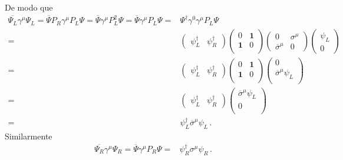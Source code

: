 De modo que
\begin{align}
  \overline{\Psi_L}\gamma^{\mu}\Psi_L=
    \overline{\Psi}P_R\gamma^{\mu}P_{L}\Psi=
  \overline{\Psi}\gamma^{\mu}P_L^2\Psi=
  \overline{\Psi}\gamma^{\mu}P_{L}\Psi=&\Psi^{\dagger}\gamma^0\gamma^{\mu}P_L \Psi \nonumber\\
=&  \begin{pmatrix}
     \psi_L^{\dagger} & \psi_R^{\dagger}  
  \end{pmatrix}
  \begin{pmatrix}
    0 & \mathbf{1} \\
    \mathbf{1} & 0 \\
  \end{pmatrix}
  \begin{pmatrix}
   0 & \sigma^{\mu}\\
   \overline{\sigma}^{\mu} & 0     
  \end{pmatrix}
  \begin{pmatrix}
   \psi_L\\
     0      
  \end{pmatrix}\nonumber\\
=&  \begin{pmatrix}
     \psi_L^{\dagger} & \psi_R^{\dagger}  
  \end{pmatrix}
  \begin{pmatrix}
    0 & \mathbf{1} \\
    \mathbf{1} & 0 \\
  \end{pmatrix}
  \begin{pmatrix}
     0\\
   \overline{\sigma}^{\mu}\psi_L\\
  \end{pmatrix}\nonumber\\
=&  \begin{pmatrix}
     \psi_L^{\dagger} & \psi_R^{\dagger}  
  \end{pmatrix}
  \begin{pmatrix}
   \overline{\sigma}^{\mu}\psi_L\\
     0\\
  \end{pmatrix}\nonumber\\
=&   \psi_L^{\dagger} \overline{\sigma}^{\mu}\psi_L\,.
\end{align}
Similarmente
\begin{align}
\overline{\Psi_R}\gamma^{\mu}\Psi_R=\overline{\Psi}\gamma^{\mu}P_{R}\Psi=&   \psi_R^{\dagger} {\sigma}^{\mu}\psi_R\,.
\end{align}



